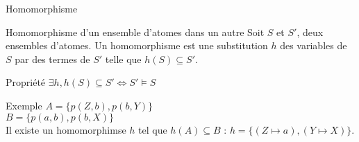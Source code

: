 \begin{frame}{Homomorphisme}
    \begin{block}{Homomorphisme d'un ensemble d'atomes dans un autre} Soit $S$ et $S'$, deux ensembles d'atomes. Un homomorphisme est une substitution $h$ des variables de $S$ par des termes de $S'$ telle que $h(S) \subseteq S'$.
    \end{block}
    \begin{block}{Propriété}
        $\exists h, h(S) \subseteq S' \Leftrightarrow S' \vDash S$
    \end{block}
    \begin{block}{Exemple}
        $A = \{p(Z,b),p(b,Y)\}$\\
        $B = \{p(a,b),p(b,X)\}$ \\
        Il existe un homomorphimse $h$ tel que $h(A) \subseteq B$ : $h = \{(Z \mapsto a), (Y \mapsto X)\}$.
    \end{block}
\end{frame}


    

    
